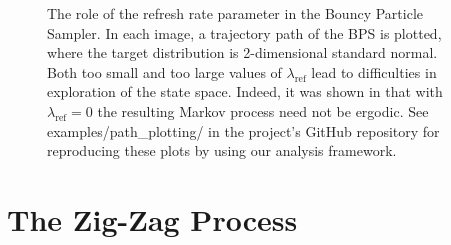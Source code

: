 \documentclass[report.tex]{subfiles}
\begin{document}
\begin{figure}
  \caption{The role of the refresh rate parameter in the Bouncy Particle Sampler.
           In each image, a trajectory path of the BPS is plotted, where
           the target distribution is 2-dimensional standard normal.
           Both too small and too large values of $\lambda_{\text{ref}}$ lead to
           difficulties in exploration of the state space. Indeed, it was shown
           in \citet{bouchard2015bouncy} that with $\lambda_{\text{ref}} = 0$ the
           resulting Markov process need not be ergodic.
           See examples/path\_plotting/ in the project's GitHub repository for
           reproducing these plots by using our analysis framework.}
  \label{image-bps-refresh-rates}
\end{figure}

\section{The Zig-Zag Process}
\end{document}
